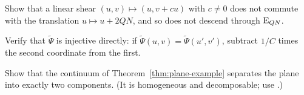 \begin{exercise}
Show that a linear shear $(u,v)\mapsto(u,v+cu)$ with $c\neq0$ does not commute with the translation $u\mapsto u+2QN$, and so does not descend through $\operatorname{E}_{QN}$.
\end{exercise}

\begin{exercise}
Verify that $\widetilde\Psi$ is injective directly: if $\widetilde\Psi(u,v)=\widetilde\Psi(u',v')$, subtract $1/C$ times the second coordinate from the first.
\end{exercise}

\begin{exercise}
Show that the continuum of Theorem~\ref{thm:plane-example} separates the plane into exactly two components. (It is homogeneous and decomposable; use .)
\end{exercise}
